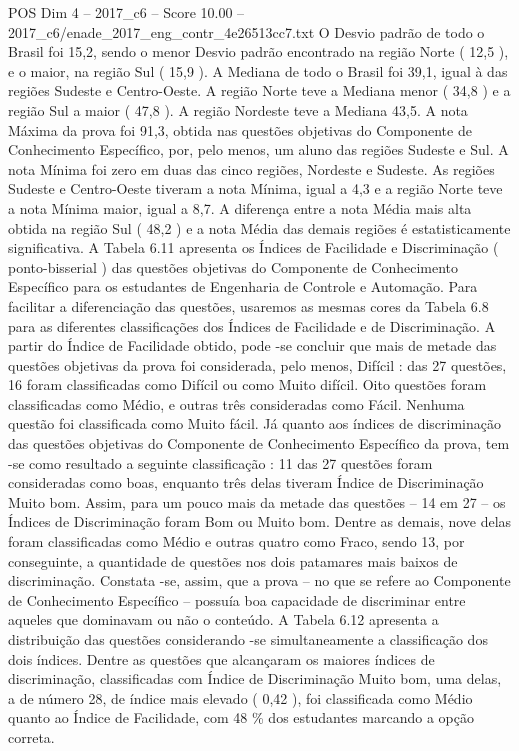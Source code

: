 \begin{textsample}{POS Dim 4 – 2017\_c6 – Score 10.00 – 2017\_c6/enade\_2017\_eng\_contr\_4e26513cc7.txt}
O Desvio padrão de todo o Brasil foi 15,2, sendo o menor Desvio padrão encontrado na região Norte ( 12,5 ), e o maior, na região Sul ( 15,9 ).
A Mediana de todo o Brasil foi 39,1, igual à das regiões Sudeste e Centro-Oeste.
A região Norte teve a Mediana menor ( 34,8 ) e a região Sul a maior ( 47,8 ).
A região Nordeste teve a Mediana 43,5.
A nota Máxima da prova foi 91,3, obtida nas questões objetivas do Componente de Conhecimento Específico, por, pelo menos, um aluno das regiões Sudeste e Sul.
A nota Mínima foi zero em duas das cinco regiões, Nordeste e Sudeste.
As regiões Sudeste e Centro-Oeste tiveram a nota Mínima, igual a 4,3 e a região Norte teve a nota Mínima maior, igual a 8,7.
A diferença entre a nota Média mais alta obtida na região Sul ( 48,2 ) e a nota Média das demais regiões é estatisticamente significativa.
A Tabela 6.11 apresenta os Índices de Facilidade e Discriminação ( ponto-bisserial ) das questões objetivas do Componente de Conhecimento Específico para os estudantes de Engenharia de Controle e Automação.
Para facilitar a diferenciação das questões, usaremos as mesmas cores da Tabela 6.8 para as diferentes classificações dos Índices de Facilidade e de Discriminação.
A partir do Índice de Facilidade obtido, pode -se concluir que mais de metade das questões objetivas da prova foi considerada, pelo menos, Difícil : das 27 questões, 16 foram classificadas como Difícil ou como Muito difícil.
Oito questões foram classificadas como Médio, e outras três consideradas como Fácil.
Nenhuma questão foi classificada como Muito fácil.
Já quanto aos índices de discriminação das questões objetivas do Componente de Conhecimento Específico da prova, tem -se como resultado a seguinte classificação : 11 das 27 questões foram consideradas como boas, enquanto três delas tiveram Índice de Discriminação Muito bom.
Assim, para um pouco mais da metade das questões – 14 em 27 – os Índices de Discriminação foram Bom ou Muito bom.
Dentre as demais, nove delas foram classificadas como Médio e outras quatro como Fraco, sendo 13, por conseguinte, a quantidade de questões nos dois patamares mais baixos de discriminação.
Constata -se, assim, que a prova – no que se refere ao Componente de Conhecimento Específico – possuía boa capacidade de discriminar entre aqueles que dominavam ou não o conteúdo.
A Tabela 6.12 apresenta a distribuição das questões considerando -se simultaneamente a classificação dos dois índices.
Dentre as questões que alcançaram os maiores índices de discriminação, classificadas com Índice de Discriminação Muito bom, uma delas, a de número 28, de índice mais elevado ( 0,42 ), foi classificada como Médio quanto ao Índice de Facilidade, com 48 \% dos estudantes marcando a opção correta.

\end{textsample}
